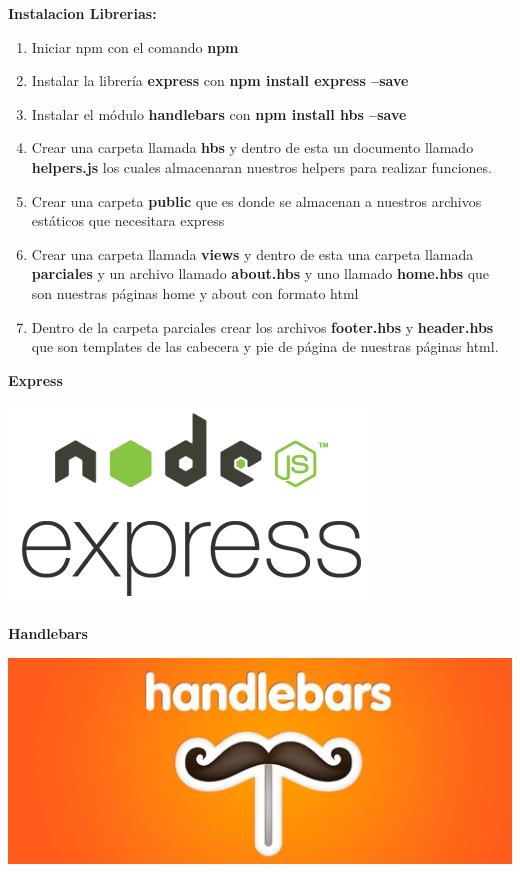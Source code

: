 \documentclass{report}
\begin{document}
    \textbf{
    Instalacion Librerias:}
    \begin{enumerate}
     \item Iniciar npm con el comando \textbf{npm}
      \item Instalar la librería \textbf{express} con \textbf{npm install express --save}
      \item Instalar el módulo \textbf{handlebars} con \textbf{npm install hbs --save}
      \item Crear una carpeta llamada \textbf{hbs} y dentro de esta un documento llamado \textbf{helpers.js} los cuales almacenaran nuestros helpers para realizar funciones.
      \item Crear una carpeta \textbf{public } que es donde se almacenan a nuestros archivos estáticos que necesitara express
      \item Crear una carpeta llamada \textbf{views} y dentro de esta una carpeta llamada \textbf{parciales} y un archivo llamado \textbf{about.hbs} y uno llamado \textbf{home.hbs} que son nuestras páginas home y about con formato html
      \item Dentro de la carpeta parciales crear los archivos \textbf{footer.hbs} y \textbf{header.hbs} que son templates de las cabecera y pie de página de nuestras páginas html.
    \end{enumerate}
   
   \textbf{Express}
     \begin{center}
      \includegraphics[scale=0.5]{exp.png}
     \end{center}
    \textbf{Handlebars}
     \begin{center}
      \includegraphics[scale=0.1]{hbs.jpg}
     \end{center}
\end{document}
